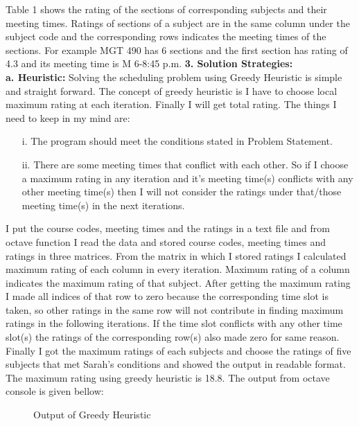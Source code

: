 \documentclass[paper=letter, fontsize=11pt]{scrartcl} %
\begin{document}
Table 1 shows the rating of the sections of corresponding subjects and their meeting times. Ratings of sections of a subject are in the same column under the subject code and the corresponding rows indicates the meeting times of the sections. For example MGT 490 has 6 sections and the first section has rating of 4.3 and its meeting time is M 6-8:45 p.m.
\newline
\newline
\Large \textbf{3. Solution Strategies:}\\
\newline
 \normalsize \textbf{a. Heuristic:}
Solving the scheduling problem using Greedy Heuristic is simple and straight forward. The concept of greedy heuristic is I have to choose local maximum rating at each iteration. Finally I will get total rating. The things I need to keep in my mind are:  
\begin{enumerate}[align=left,style=nextline,leftmargin=1.5cm,labelsep=\parindent,font=\normalfont]
\item[i.] The program should meet the conditions stated in Problem Statement.
\item[ii.] There are some meeting times that conflict with each other. So if I choose a maximum rating in any iteration and it's meeting time(s) conflicts with any other meeting time(s) then I will not consider the ratings under that/those meeting time(s) in the next iterations.
\end{enumerate}  

I put the course codes, meeting times and the ratings in a text file and from octave function I read the data and stored course codes, meeting times and ratings in three matrices. From the matrix in which I stored ratings I calculated maximum rating of each column in every iteration. Maximum rating of a column indicates the maximum rating of that subject. After getting the maximum rating I made all indices of that row to zero because the corresponding time slot is taken, so other ratings in the same row will not contribute in finding maximum ratings in the following iterations. If the time slot conflicts with any other time slot(s) the ratings of the corresponding row(s) also made zero for same reason. Finally I got the maximum ratings of each subjects and choose the ratings of five subjects that met Sarah's conditions and showed the output in readable format. The maximum rating using greedy heuristic is 18.8.
The output from octave console is given bellow:

\begin{figure}[H]
  
  \centering
    
    \caption{Output of Greedy Heuristic}
\end{figure}
\end{document}

